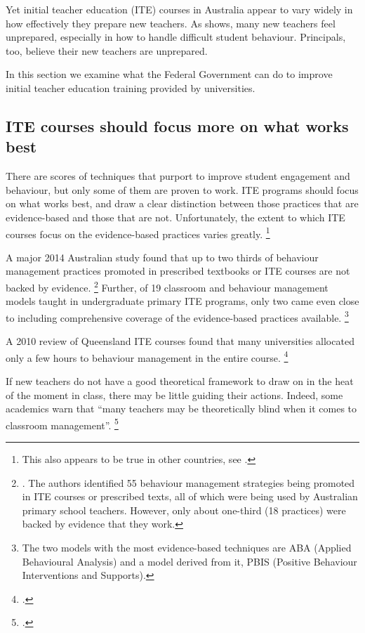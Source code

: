 \documentclass[FrontPage]{grattan}
\begin{document}
Yet initial teacher education (ITE) courses in Australia appear to vary widely in how effectively they prepare new teachers. As  shows, many new teachers feel unprepared, especially in how to handle difficult student behaviour. Principals, too, believe their new teachers are unprepared. 

In this section we examine what the Federal Government can do to improve initial teacher education training provided by universities.

\subsection{ITE courses should focus more on what works best}\label{subsec:ITE-focus-more-on-theory}
There are scores of techniques that purport to improve student engagement and behaviour, but only some of them are proven to work. ITE programs should focus on what works best, and draw a clear distinction between those practices that are evidence-based and those that are not. Unfortunately, the extent to which ITE courses focus on the evidence-based practices varies greatly.%
    \footnote{This also appears to be true in other countries, see \textcite{Greenberg2014TrainingOurFuture}.}

A major 2014 Australian study found that up to two thirds of behaviour management practices promoted in prescribed textbooks or ITE courses are not backed by evidence.%
    \footnote{\textcite{ONeillStephenson2014EvidenceBasedClassroom}. The authors identified 55 behaviour management strategies being promoted in ITE courses or prescribed texts, all of which were being used by Australian primary school teachers. However, only about one-third (18 practices) were backed by evidence that they work.}
Further, of 19 classroom and behaviour management models taught in undergraduate primary ITE programs, only two came even close to including comprehensive coverage of the evidence-based practices available.%
    \footnote{\textcite{ONeillStephenson2014EvidenceBasedClassroom}The two models with the most evidence-based techniques are ABA (Applied Behavioural Analysis) and a model derived from it, PBIS (Positive Behaviour Interventions and Supports).}

A 2010 review of Queensland ITE courses found that many universities allocated only a few hours to behaviour management in the entire course.%
    \footcite[][12]{Caldwell2010ReviewTeacherEducation}

If new teachers do not have a good theoretical framework to draw on in the heat of the moment in class, there may be little guiding their actions. Indeed, some academics warn that “many teachers may be theoretically blind when it comes to classroom management''.%
    \footcite{RileyBrew2010WhyDidYouDoThat}
 
\end{document}
